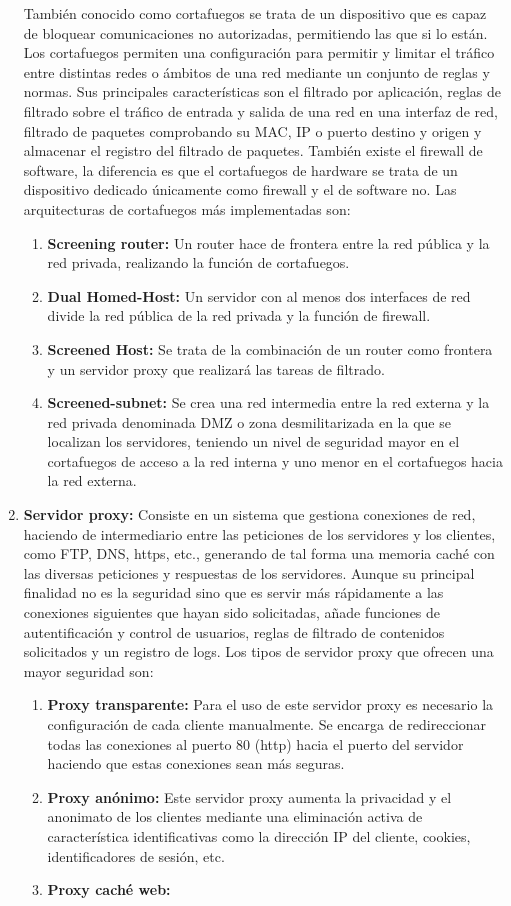\begin{enumerate}
También conocido como cortafuegos se trata de un dispositivo que es capaz de bloquear comunicaciones no autorizadas, permitiendo las que si lo están. Los cortafuegos permiten una configuración para permitir y limitar el tráfico entre distintas redes o ámbitos de una red mediante un conjunto de reglas y normas. Sus principales características son el filtrado por aplicación, reglas de filtrado sobre el tráfico de entrada y salida de una red en una interfaz de red, filtrado de paquetes comprobando su MAC, IP o puerto destino y origen y almacenar el registro del filtrado de paquetes. También existe el firewall de software, la diferencia es que el cortafuegos de hardware se trata de un dispositivo dedicado únicamente como firewall y el de software no. Las arquitecturas de cortafuegos más implementadas son:
\begin{enumerate}
\item {\bfseries Screening router:}
 Un router hace de frontera entre la red pública y la red privada, realizando la función de cortafuegos.
\item {\bfseries Dual Homed-Host:}
Un servidor con al menos dos interfaces de red divide la red pública de la red privada y la función de firewall.
\item {\bfseries Screened Host:}
Se trata de la combinación de un router como frontera y un servidor proxy que realizará las tareas de filtrado.
\item {\bfseries Screened-subnet:}
Se crea una red intermedia entre la red externa y la red privada denominada DMZ o zona desmilitarizada en la que se localizan los servidores, teniendo un nivel de seguridad mayor en el cortafuegos de acceso a la red interna y uno menor en el cortafuegos hacia la red externa.
\end{enumerate}
\item {\bfseries Servidor proxy:}
Consiste en un sistema que gestiona conexiones de red, haciendo de intermediario entre las peticiones de los servidores y los clientes, como FTP, DNS, https, etc., generando de tal forma una memoria caché con las diversas peticiones y respuestas de los servidores. Aunque su principal finalidad no es la seguridad sino que es servir más rápidamente a las conexiones siguientes que hayan sido solicitadas, añade funciones de autentificación y control de usuarios, reglas de filtrado de contenidos solicitados y un registro de logs. Los tipos de servidor proxy que ofrecen una mayor seguridad son:
\begin{enumerate}
\item {\bfseries Proxy transparente:}
Para el uso de este servidor proxy es necesario la configuración de cada cliente manualmente. Se encarga de redireccionar todas las conexiones al puerto 80 (http) hacia el puerto del servidor haciendo que estas conexiones sean más seguras.
\item {\bfseries Proxy anónimo:} 
Este servidor proxy aumenta la privacidad y el anonimato de los clientes mediante una eliminación activa de característica identificativas como la dirección IP del cliente, cookies, identificadores de sesión, etc.
\item {\bfseries Proxy caché web:}


\end{enumerate}
\end{enumerate}
